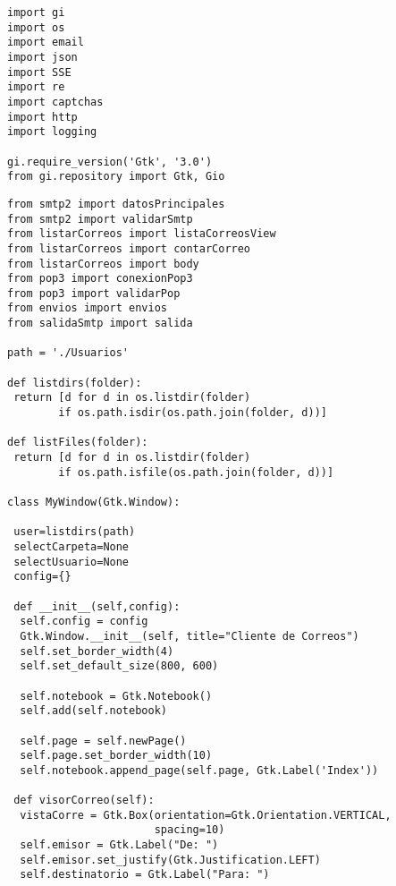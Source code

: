 \begin{lstlisting}[frame=single]
import gi
import os
import email
import json
import SSE
import re
import captchas
import http
import logging

gi.require_version('Gtk', '3.0')
from gi.repository import Gtk, Gio
\end{lstlisting}
\begin{lstlisting}[frame=single]
from smtp2 import datosPrincipales
from smtp2 import validarSmtp
from listarCorreos import listaCorreosView
from listarCorreos import contarCorreo
from listarCorreos import body
from pop3 import conexionPop3
from pop3 import validarPop
from envios import envios
from salidaSmtp import salida

path = './Usuarios'

def listdirs(folder):
 return [d for d in os.listdir(folder) 
        if os.path.isdir(os.path.join(folder, d))]

def listFiles(folder):
 return [d for d in os.listdir(folder) 
        if os.path.isfile(os.path.join(folder, d))]

class MyWindow(Gtk.Window):

 user=listdirs(path)
 selectCarpeta=None
 selectUsuario=None
 config={}

 def __init__(self,config):
  self.config = config
  Gtk.Window.__init__(self, title="Cliente de Correos")
  self.set_border_width(4)
  self.set_default_size(800, 600)

  self.notebook = Gtk.Notebook()
  self.add(self.notebook)

  self.page = self.newPage()
  self.page.set_border_width(10)
  self.notebook.append_page(self.page, Gtk.Label('Index'))

 def visorCorreo(self):
  vistaCorre = Gtk.Box(orientation=Gtk.Orientation.VERTICAL, 
                       spacing=10)
  self.emisor = Gtk.Label("De: ")
  self.emisor.set_justify(Gtk.Justification.LEFT)
  self.destinatorio = Gtk.Label("Para: ")
\end{lstlisting}
